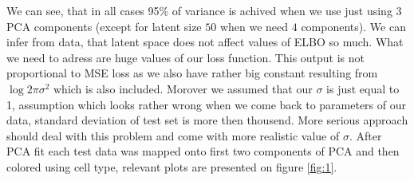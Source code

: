 \documentclass[12pt,a4paper]{article}
\begin{document}
We can see, that in all cases 95\% of variance is achived when we use just using $3$ PCA components (except for latent size $50$ when we need $4$ components). 
We can infer from data, that latent space does not affect values of ELBO so much. What we need to adress are huge values of our loss function. This output is 
not proportional to MSE loss as we also have rather big constant resulting from $\log{2\pi \sigma^2}$ which is also included. Morover we assumed that our $\sigma$
is just equal to 1, assumption which looks rather wrong when we come back to parameters of our data, standard deviation of test set is more then thousend.
More serious approach should deal with this problem and come with more realistic value of $\sigma$. After PCA fit each test data was mapped onto 
first two components of PCA and then colored using cell type, relevant plots are presented on figure \ref{fig:1}.
\end{document}
